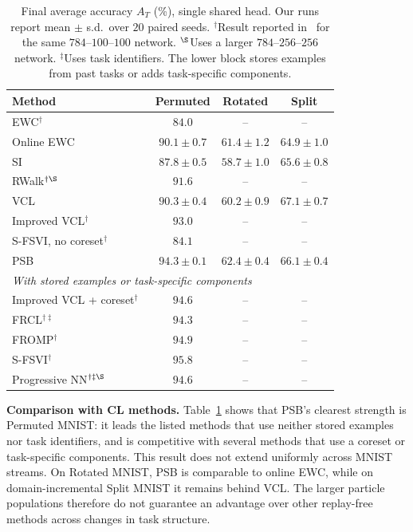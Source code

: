 \begin{table}[t]
\centering
\caption{Final average accuracy $A_T$ (\%), single shared head. Our runs
report mean $\pm$ s.d.\ over $20$ paired seeds. $^\dagger$Result reported
in~\cite{nguyen2018vcl,swaroop2019improving,rudner2022sfsvi,chaudhry2019agem}
for the same $784$--$100$--$100$ network. $^\S$Uses a larger
$784$--$256$--$256$ network. $^\ddagger$Uses task identifiers. The lower block stores examples from past tasks or adds
task-specific components.}
\label{tab:main_results}
\footnotesize
\setlength{\tabcolsep}{3pt}
\begin{tabular}{lccc}
\hline
Method & Permuted & Rotated & Split \\
\hline
EWC$^\dagger$~\cite{kirkpatrick2017ewc} & $84.0$ & -- & -- \\
Online EWC~\cite{schwarz2018progress} & $90.1\pm0.7$ & $61.4\pm1.2$
    & $64.9\pm1.0$ \\
SI~\cite{zenke2017si} & $87.8\pm0.5$ & $58.7\pm1.0$ & $65.6\pm0.8$ \\
RWalk$^{\dagger\S}$~\cite{chaudhry2018rwalk} & $91.6$ & -- & -- \\
VCL~\cite{nguyen2018vcl} & $90.3\pm0.4$ & $60.2\pm0.9$
    & $\mathbf{67.1\pm0.7}$ \\
Improved VCL$^\dagger$~\cite{swaroop2019improving} & $93.0$ & -- & -- \\
S-FSVI, no coreset$^\dagger$~\cite{rudner2022sfsvi} & $84.1$ & -- & -- \\
PSB & $\mathbf{94.3\pm0.1}$ & $\mathbf{62.4\pm0.4}$ & $66.1\pm0.4$ \\
\hline
\multicolumn{4}{l}{\textit{With stored examples or task-specific components}} \\
Improved VCL + coreset$^\dagger$~\cite{swaroop2019improving} & $94.6$ & -- & -- \\
FRCL$^{\dagger\ddagger}$~\cite{titsias2020frcl} & $94.3$ & -- & -- \\
FROMP$^\dagger$~\cite{pan2020fromp} & $94.9$ & -- & -- \\
S-FSVI$^\dagger$~\cite{rudner2022sfsvi} & $95.8$ & -- & -- \\
Progressive NN$^{\dagger\ddagger\S}$~\cite{rusu2016progressive} & $94.6$ & -- & -- \\
\hline
\end{tabular}
\end{table}

\textbf{Comparison with CL methods.} Table~\ref{tab:main_results} shows that
PSB's clearest strength is Permuted MNIST: it leads the listed methods that
use neither stored examples nor task identifiers, and is competitive with
several methods that use a coreset or task-specific components. This result
does not extend uniformly across MNIST streams. On Rotated MNIST, PSB is
comparable to online EWC, while on domain-incremental Split MNIST it remains
behind VCL. The larger particle populations therefore do not guarantee
an advantage over other replay-free methods across changes in task
structure.

